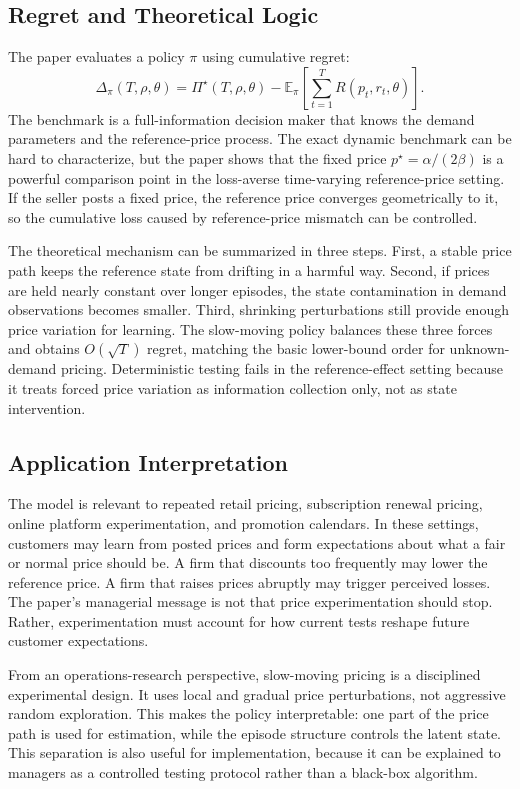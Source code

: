 \documentclass[conference]{../../LaTex_Template/IEEEtran}
\begin{document}
\subsection{Regret and Theoretical Logic}
The paper evaluates a policy $\pi$ using cumulative regret:
\begin{equation}
\Delta_\pi(T,\rho,\theta)=\Pi^\star(T,\rho,\theta)
-\mathbb{E}_\pi\left[\sum_{t=1}^T R(p_t,r_t,\theta)\right].
\end{equation}
The benchmark is a full-information decision maker that knows the demand parameters and the reference-price process. The exact dynamic benchmark can be hard to characterize, but the paper shows that the fixed price $p^\star=\alpha/(2\beta)$ is a powerful comparison point in the loss-averse time-varying reference-price setting. If the seller posts a fixed price, the reference price converges geometrically to it, so the cumulative loss caused by reference-price mismatch can be controlled.

The theoretical mechanism can be summarized in three steps. First, a stable price path keeps the reference state from drifting in a harmful way. Second, if prices are held nearly constant over longer episodes, the state contamination in demand observations becomes smaller. Third, shrinking perturbations still provide enough price variation for learning. The slow-moving policy balances these three forces and obtains $O(\sqrt{T})$ regret, matching the basic lower-bound order for unknown-demand pricing. Deterministic testing fails in the reference-effect setting because it treats forced price variation as information collection only, not as state intervention.

\subsection{Application Interpretation}
The model is relevant to repeated retail pricing, subscription renewal pricing, online platform experimentation, and promotion calendars. In these settings, customers may learn from posted prices and form expectations about what a fair or normal price should be. A firm that discounts too frequently may lower the reference price. A firm that raises prices abruptly may trigger perceived losses. The paper's managerial message is not that price experimentation should stop. Rather, experimentation must account for how current tests reshape future customer expectations.

From an operations-research perspective, slow-moving pricing is a disciplined experimental design. It uses local and gradual price perturbations, not aggressive random exploration. This makes the policy interpretable: one part of the price path is used for estimation, while the episode structure controls the latent state. This separation is also useful for implementation, because it can be explained to managers as a controlled testing protocol rather than a black-box algorithm.
\end{document}
